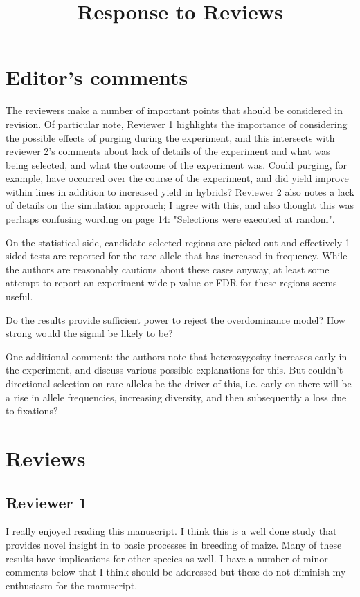 \documentclass[onecolumn,oneside,letterpaper]{article}
\title{Response to Reviews}
\begin{document}
\maketitle


\section*{Editor's comments}

The reviewers make a number of important points that should be considered in revision. Of particular note, Reviewer 1 highlights the importance of considering the possible effects of purging during the experiment, and this intersects with reviewer 2's comments about lack of details of the experiment and what was being selected, and what the outcome of the experiment was. Could purging, for example, have occurred over the course of the experiment, and did yield improve within lines in addition to increased yield in hybrids? Reviewer 2 also notes a lack of details on the simulation approach; I agree with this, and also thought this was perhaps confusing wording on page 14: "Selections were executed at random".

On the statistical side, candidate selected regions are picked out and effectively 1-sided tests are reported for the rare allele that has increased in frequency. While the authors are reasonably cautious about these cases anyway, at least some attempt to report an experiment-wide p value or FDR for these regions seems useful.


Do the results provide sufficient power to reject the overdominance model? How strong would the signal be likely to be?


One additional comment: the authors note that heterozygosity increases early in the experiment, and discuss various possible explanations for this. But couldn't directional selection on rare alleles be the driver of this, i.e. early on there will be a rise in allele frequencies, increasing diversity, and then subsequently a loss due to fixations?


\section*{Reviews}
\subsection*{Reviewer 1}
I really enjoyed reading this manuscript.  I think this is a well done study 
that provides novel insight in to basic processes in breeding of maize.  Many of 
these results have implications for other species as well.  I have a number of 
minor comments below that I think should be addressed but these do not diminish 
my enthusiasm for the manuscript.
\end{document}
